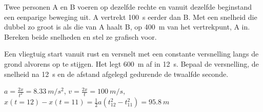 \documentclass{ximera}
\begin{document}
\begin{exercise}
    Twee personen A en B voeren op dezelfde rechte en vanuit dezelfde beginstand een eenparige beweging uit. A vertrekt \SI{100}{s} eerder dan B. Met een snelheid die dubbel zo groot is als die van A haalt B, op \SI{400}{m} van het vertrekpunt, A in. Bereken beide snelheden en stel ze grafisch voor.
\end{exercise}

\begin{exercise}
    Een vliegtuig start vanuit rust en versnelt met een constante versnelling langs de grond alvorens op te stijgen. Het legt \SI{600}{m} af in \SI{12}{s}. Bepaal de versnelling, de snelheid na \SI{12}{s} en de afstand afgelegd gedurende de twaalfde seconde.

    \begin{oplossing}
        $a=\frac{2x}{t^2}=\SI{8,33}{m/s^2}$,
        $v=\frac{2x}{t}=\SI{100}{m/s}$,
        $x(t=12)-x(t=11)=\frac{1}{2}a(t_{12}^2-t_{11}^2)=\SI{95,8}{m}$
    \end{oplossing}
\end{exercise}
\end{document}
